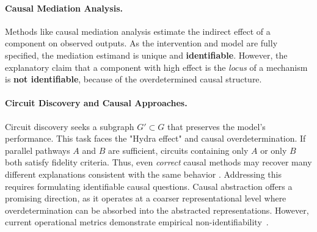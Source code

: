 
\paragraph{Causal Mediation Analysis.}
Methods like causal mediation analysis \citep{meng2022locating, vig2020causalmediationanalysisinterpreting} estimate the indirect effect of a component on observed outputs. As the intervention and model are fully specified, the mediation estimand is unique and \textbf{identifiable}. However, the explanatory claim that a component with high effect is the \textit{locus} of a mechanism is \textbf{not identifiable}, because of the overdetermined causal structure. 

\paragraph{Circuit Discovery and Causal Approaches.}
Circuit discovery seeks a subgraph $G' \subset G$ that preserves the model's performance. This task faces the "Hydra effect" \citep{mcgrath2023hydraeffectemergentselfrepair} and causal overdetermination. If parallel pathways $A$ and $B$ are sufficient, circuits containing only $A$ or only $B$ both satisfy fidelity criteria. Thus, even \textit{correct} causal methods may recover many different explanations consistent with the same behavior \citep{melouxeverything}. Addressing this requires formulating identifiable causal questions. Causal abstraction \citep{Beckers_Halpern_2019,geiger2025causalabstractiontheoreticalfoundation} offers a promising direction, as it operates at a coarser representational level where overdetermination can be absorbed into the abstracted representations. However, current operational metrics demonstrate empirical non-identifiability~\citep{melouxeverything, sutter2025nonlinearrepresentationdilemmacausal}.

